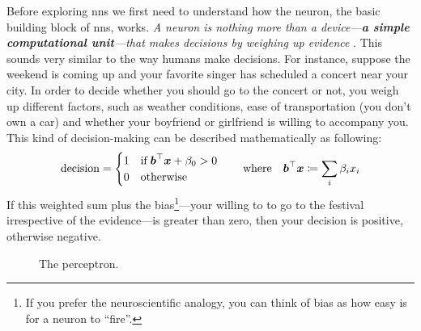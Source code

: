 Before exploring \glspl{nn} we first need to understand how the neuron, the
basic building block of \glspl{nn}, works.  \emph{A neuron is nothing more than
a device---\textbf{a simple computational unit}---that makes decisions by weighing up
evidence} \parencite{Nielsen2018}. This sounds very similar to the way humans
make decisions. For instance, suppose the weekend is coming up and your favorite
singer has scheduled a concert near your city. In order to decide whether you
should go to the concert or not, you weigh up different factors, such as weather
conditions, ease of transportation (you don't own a car) and whether your
boyfriend or girlfriend is willing to accompany you. This kind of
decision-making can be described mathematically as following:
\begin{equation}
	\label{eq:perceptron}
	\text{decision}
	=
	\begin{cases}
		1 \quad \text{if}\; \boldsymbol{b}^\top \boldsymbol{x} + \beta_0 > 0 \\
		0 \quad \text{otherwise}
	\end{cases}
	\quad
	\text{where}
	\quad
	\boldsymbol{b}^\top\boldsymbol{x} \coloneqq \sum_i \beta_i x_i
\end{equation}
If this weighted sum plus the bias\footnote{If
you prefer the neuroscientific analogy, you can think of bias as how easy is for
a neuron to ``fire''.}---your willing to to go to the festival
irrespective of the evidence---is greater than zero, then your decision is
positive, otherwise negative.

\begin{figure}
	\centering
	\caption{The perceptron.}
	\label{fig:perceptron}
\end{figure}

